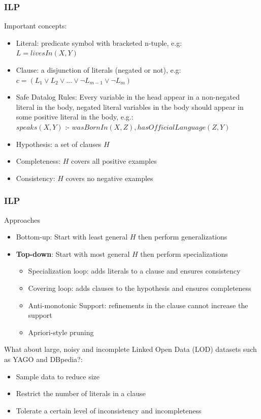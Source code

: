 \documentclass{beamer}
\begin{document}
\begin{frame}
\frametitle{ILP}
Important concepts:
  \begin{itemize}
   \item Literal: predicate symbol with bracketed n-tuple, e.g: \\ \quad $L=livesIn(X,Y)$
   \item Clause: a disjunction of literals (negated or not), e.g: \\ \quad $c=(L_1 \vee L_2 \vee \ldots \vee \neg
L_{m-1} \vee \neg L_{m})$
   \item Safe Datalog Rules: Every variable in the head appear in a non-negated literal in the body, negated literal
variables in the body should appear in some positive literal in the body, e.g.: \\ \quad 
    $speaks(X,Y)$ :- $wasBornIn(X,Z),hasOfficialLanguage(Z,Y)$
   \item Hypothesis: a set of clauses $H$
   \item Completeness: $H$ covers all positive examples
   \item Consistency: $H$ covers no negative examples
  \end{itemize}
\end{frame}
\begin{frame}
\frametitle{ILP}
Approaches
  \begin{itemize}
   \item Bottom-up: Start with least general $H$ then perform generalizations
   \item \textbf{Top-down}: Start with most general $H$ then perform specializations
   \begin{itemize}
    \item Specialization loop: adds literals to a clause and ensures consistency
    \item Covering loop: adds clauses to the hypothesis and ensures completeness
    \item Anti-monotonic Support: refinements in the clause cannot increase the support
    \item Apriori-style pruning
   \end{itemize}
  \end{itemize}
What about large, noisy and incomplete Linked Open Data (LOD) datasets such as YAGO and DBpedia?:
\begin{itemize}
   \item Sample data to reduce size
   \item Restrict the number of literals in a clause
   \item Tolerate a certain level of inconsistency and incompleteness
  \end{itemize}
\end{frame}
\end{document}
